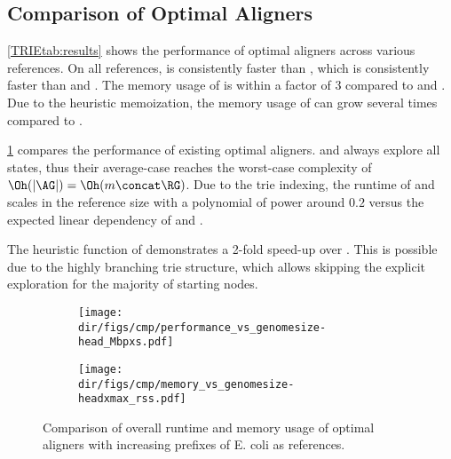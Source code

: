 \subsection{Comparison of Optimal Aligners}

\cref{TRIEtab:results} shows the performance of optimal aligners across various
references. On all references, \astarix is consistently faster than \dijkstra,
which is consistently faster than \pasgal and \bitparallel. The memory usage of
\dijkstra is within a factor of 3 compared to \pasgal and \bitparallel. Due to
the heuristic memoization, the memory usage of \astarix can grow several times
compared to \dijkstra.



\cref{TRIEfig:scaling_with_graphsize} compares the performance of existing optimal
aligners. \bitparallel and \pasgal always explore all states, thus their
average-case reaches the worst-case complexity of $\Oh(\lvert \AG \rvert) =
\Oh(m \concat \RG)$. Due to the trie indexing, the runtime of \astarix and
\dijkstra scales in the reference size with a polynomial of power around $0.2$
versus the expected linear dependency of \bitparallel and \pasgal.

The heuristic function of \astarix demonstrates a 2-fold speed-up over
\dijkstra. This is possible due to the highly branching trie structure, which
allows skipping the explicit exploration for the majority of starting nodes. 

\begin{figure}[t]
  \begin{subfigure}{.49\textwidth}
    \centering
    \texttt{[image: \\dir/figs/cmp/performance\_vs\_genomesize-head\_Mbpxs.pdf]}
  \end{subfigure}
  \begin{subfigure}{.49\textwidth}
    \centering
    \texttt{[image: \\dir/figs/cmp/memory\_vs\_genomesize-headxmax\_rss.pdf]}
  \end{subfigure}
  \caption{Comparison of overall runtime and memory usage of optimal aligners
     with increasing prefixes of E. coli as references.}
  \label{TRIEfig:scaling_with_graphsize}
\end{figure}
